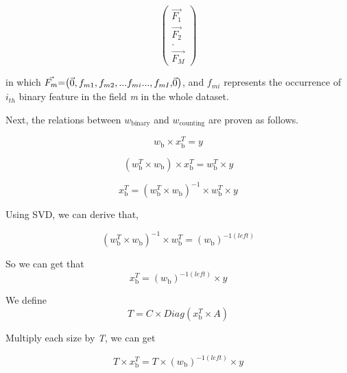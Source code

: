 $$
\begin{pmatrix} 
\vec{F_1} \\
\vec{F_2} \\
.\\
\vec{F_M}

\end{pmatrix}
$$

\noindent in which \($$\vec{F_m}$$ = $$\begin{pmatrix} 
$$\vec{0 }$$ , f_{m1}, f_{m2}, ...f_{mi}... , f_{mI} ,$$\vec{0 }$$ 
\end{pmatrix}$$\), and \(f_{mi}\) represents the occurrence of \(i_{th}\) binary feature in the field \textsl{m} in the whole dataset.\vspace{5mm}

\noindent Next, the relations between \(w_{\text{binary}}\) and \(w_{\text{counting}}\) are proven as follows. 

\begin{equation}
w_{\text{b}} \times x_{\text{b}}^T = y 
\end{equation}

\begin{equation}
(w_{\text{b}}^T \times w_{\text{b}}) \times x_{\text{b}}^T = w_{\text{b}}^T \times y 
\end{equation}

\begin{equation}
x_{\text{b}}^T = (w_{\text{b}}^T \times w_{\text{b}})^{-1} \times w_{\text{b}}^T \times y 
\end{equation}

Using SVD, we can derive that,

\begin{equation}
(w_{\text{b}}^T \times w_{\text{b}})^{-1} \times w_{\text{b}}^T = (w_{\text{b}})^{-1(left)}  
\end{equation}

So we can get that 
\begin{equation}
x_{\text{b}}^T =  (w_{\text{b}})^{-1(left)} \times y 
\end{equation}

We define
\begin{equation}
T = C \times Diag(x_{\text{b}}^T \times A)
\end{equation}


Multiply each size by \textsl{T}, we can get
 
\begin{equation}
T \times x_{\text{b}}^T =  T \times (w_{\text{b}})^{-1(left)} \times y 
\end{equation}

